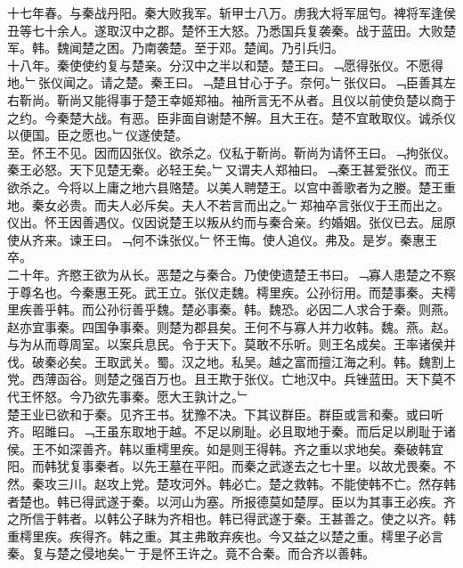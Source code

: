 \documentclass{zhvt-classic}
\begin{document}
\hspace*{2em}十七年春。与秦战丹阳。秦大败我军。斩甲士八万。虏我大将军屈匄。裨将军逢侯丑等七十余人。遂取汉中之郡。楚怀王大怒。乃悉国兵复袭秦。战于蓝田。大败楚军。韩。魏闻楚之困。乃南袭楚。至于邓。楚闻。乃引兵归。\\
\hspace*{2em}十八年。秦使使约复与楚亲。分汉中之半以和楚。楚王曰。﹁愿得张仪。不愿得地。﹂张仪闻之。请之楚。秦王曰。﹁楚且甘心于子。奈何。﹂张仪曰。﹁臣善其左右靳尚。靳尚又能得事于楚王幸姬郑袖。袖所言无不从者。且仪以前使负楚以商于之约。今秦楚大战。有恶。臣非面自谢楚不解。且大王在。楚不宜敢取仪。诚杀仪以便国。臣之愿也。﹂仪遂使楚。\\
\hspace*{2em}至。怀王不见。因而囚张仪。欲杀之。仪私于靳尚。靳尚为请怀王曰。﹁拘张仪。秦王必怒。天下见楚无秦。必轻王矣。﹂又谓夫人郑袖曰。﹁秦王甚爱张仪。而王欲杀之。今将以上庸之地六县赂楚。以美人聘楚王。以宫中善歌者为之媵。楚王重地。秦女必贵。而夫人必斥矣。夫人不若言而出之。﹂郑袖卒言张仪于王而出之。仪出。怀王因善遇仪。仪因说楚王以叛从约而与秦合亲。约婚姻。张仪已去。屈原使从齐来。谏王曰。﹁何不诛张仪。﹂怀王悔。使人追仪。弗及。是岁。秦惠王卒。\\
\hspace*{2em}二十年。齐愍王欲为从长。恶楚之与秦合。乃使使遗楚王书曰。﹁寡人患楚之不察于尊名也。今秦惠王死。武王立。张仪走魏。樗里疾。公孙衍用。而楚事秦。夫樗里疾善乎韩。而公孙衍善乎魏。楚必事秦。韩。魏恐。必因二人求合于秦。则燕。赵亦宜事秦。四国争事秦。则楚为郡县矣。王何不与寡人并力收韩。魏。燕。赵。与为从而尊周室。以案兵息民。令于天下。莫敢不乐听。则王名成矣。王率诸侯并伐。破秦必矣。王取武关。蜀。汉之地。私吴。越之富而擅江海之利。韩。魏割上党。西薄函谷。则楚之强百万也。且王欺于张仪。亡地汉中。兵锉蓝田。天下莫不代王怀怒。今乃欲先事秦。愿大王孰计之。﹂\\
\hspace*{2em}楚王业已欲和于秦。见齐王书。犹豫不决。下其议群臣。群臣或言和秦。或曰听齐。昭雎曰。﹁王虽东取地于越。不足以刷耻。必且取地于秦。而后足以刷耻于诸侯。王不如深善齐。韩以重樗里疾。如是则王得韩。齐之重以求地矣。秦破韩宜阳。而韩犹复事秦者。以先王墓在平阳。而秦之武遂去之七十里。以故尤畏秦。不然。秦攻三川。赵攻上党。楚攻河外。韩必亡。楚之救韩。不能使韩不亡。然存韩者楚也。韩已得武遂于秦。以河山为塞。所报德莫如楚厚。臣以为其事王必疾。齐之所信于韩者。以韩公子眛为齐相也。韩已得武遂于秦。王甚善之。使之以齐。韩重樗里疾。疾得齐。韩之重。其主弗敢弃疾也。今又益之以楚之重。樗里子必言秦。复与楚之侵地矣。﹂于是怀王许之。竟不合秦。而合齐以善韩。\\
\end{document}
